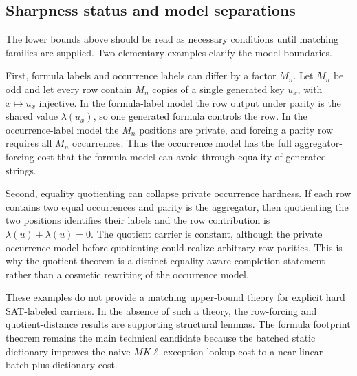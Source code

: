 %
%
%
\subsection{Sharpness status and model separations}
\label{subsec:sharpness-status}

The lower bounds above should be read as necessary conditions until matching
families are supplied.  Two elementary examples clarify the model boundaries.

First, formula labels and occurrence labels can differ by a factor \(M_n\).
Let \(M_n\) be odd and let every row contain \(M_n\) copies of a single generated
key \(u_x\), with \(x\mapsto u_x\) injective.  In the formula-label model the
row output under parity is the shared value \(\lambda(u_x)\), so one generated
formula controls the row.  In the occurrence-label model the \(M_n\) positions
are private, and forcing a parity row requires all \(M_n\) occurrences.  Thus
the occurrence model has the full aggregator-forcing cost that the formula
model can avoid through equality of generated strings.

Second, equality quotienting can collapse private occurrence hardness.  If each
row contains two equal occurrences and parity is the aggregator, then quotienting
the two positions identifies their labels and the row contribution is
\(\lambda(u)+\lambda(u)=0\).  The quotient carrier is constant, although the
private occurrence model before quotienting could realize arbitrary row
parities.  This is why the quotient theorem is a distinct equality-aware
completion statement rather than a cosmetic rewriting of the occurrence model.

These examples do not provide a matching upper-bound theory for explicit hard
SAT-labeled carriers.  In the absence of such a theory, the row-forcing and
quotient-distance results are supporting structural lemmas.  The formula
footprint theorem remains the main technical candidate because the batched
static dictionary improves the naive \(M K\ell\) exception-lookup cost to a
near-linear batch-plus-dictionary cost.
